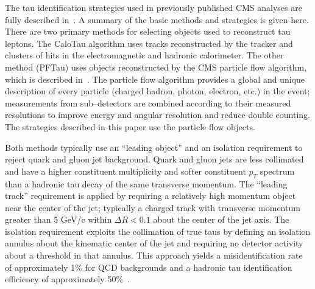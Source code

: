 The tau identification strategies used in previously published CMS analyses are
fully described in~\cite{PFT08001}.  A summary of the basic methods and
strategies is given here. There are two primary methods for selecting objects
used to reconstruct tau leptons.  The CaloTau algorithm uses tracks
reconstructed by the tracker and clusters of hits in the electromagnetic and
hadronic calorimeter.  The other method (PFTau) uses objects reconstructed by
the CMS particle flow algorithm, which is described in~\cite{PFT09}.  The
particle flow algorithm provides a global and unique description of every
particle (charged hadron, photon, electron, etc.) in the event; measurements
from sub--detectors are combined according to their measured resolutions to
improve energy and angular resolution and reduce double counting.  The
strategies described in this paper use the particle flow objects.

Both methods typically use an ``leading object'' and an isolation requirement to reject
quark and gluon jet background.  Quark and gluon jets are less collimated and
have a higher constituent multiplicity and softer constituent $p_T$ spectrum
than a hadronic tau decay of the same transverse momentum.  The ``leading
track'' requirement is applied by requiring a relatively high momentum object
near the center of the jet; typically a charged track with transverse momentum
greater than 5 GeV/c within $\Delta R < 0.1$ about the center of the jet axis.
The isolation requirement exploits the collimation of true taus by defining an
isolation annulus about the kinematic center of the jet and requiring no
detector activity about a threshold in that annulus.  This approach yields a
misidentification rate of approximately 1\% for QCD backgrounds and a hadronic
tau identification efficiency of approximately 50\%~\cite{PFT08001}.
